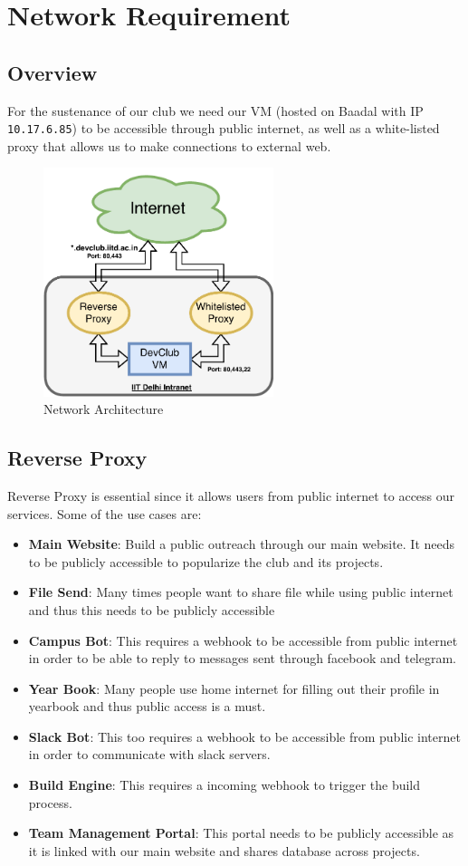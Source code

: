 \documentclass[10pt,a4paper]{article}
\begin{document}
\section{Network Requirement}
\subsection{Overview}
For the sustenance of our club we need our VM (hosted on Baadal with IP \texttt{10.17.6.85}) to be accessible through public internet, as well as a white-listed proxy that allows us to make connections to external web.
\FloatBarrier
\begin{figure}[ht]
    \centering
    \includegraphics[width=0.6\textwidth]{architecture.pdf}
    \caption{Network Architecture \label{fig:network}}
\end{figure}
\FloatBarrier
\subsection{Reverse Proxy}
Reverse Proxy is essential since it allows users from public internet to access our services. Some of the use cases are:
\begin{itemize}
    \item \textbf{Main Website}: Build a public outreach through our main website. It needs to be publicly accessible to popularize the club and its projects.
    \item \textbf{File Send}: Many times people want to share file while using public internet and thus this needs to be publicly accessible
    \item \textbf{Campus Bot}: This requires a webhook to be accessible from public internet in order to be able to reply to messages sent through facebook and telegram.
    \item \textbf{Year Book}: Many people use home internet for filling out their profile in yearbook and thus public access is a must.
    \item \textbf{Slack Bot}: This too requires a webhook to be accessible from public internet in order to communicate with slack servers.
    \item \textbf{Build Engine}: This requires a incoming webhook to trigger the build process.
    \item \textbf{Team Management Portal}: This portal needs to be publicly accessible as it is linked with our main website and shares database across projects.
\end{itemize}
\end{document}
